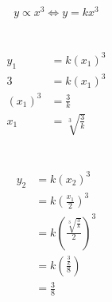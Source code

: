 \documentclass[a4paper]{article}
\begin{document}
\[y\propto x^3\iff y=kx^3\]
\\
\\
\[\begin{aligned}
	y_1&=k(x_1)^3\\
	3&=k(x_1)^3\\
	(x_1)^3&=\frac3k\\
	x_1&=\sqrt[3]{\frac3k}
\end{aligned}\]
\\
\\
\[\begin{aligned}
	y_2&=k(x_2)^3\\
	&=k\left(\frac{x_1}2\right)^3\\
	&=k\left(\frac{\sqrt[3]{\frac3k}}2\right)^3\\
	&=k\left(\frac{\frac3k}8\right)\\
	&=\boxed{\frac38}
\end{aligned}\]
\end{document}
